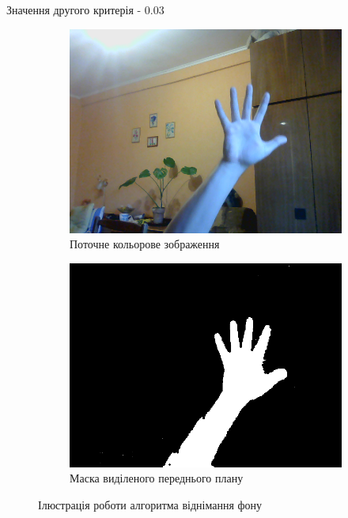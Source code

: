 Значення другого критерія - 0.03%

\begin{figure}[H]
	\centering
	\begin{subfigure}[b]{0.45\textwidth}
		\includegraphics[width=\textwidth]{practise/img/hand2}
		\caption{Поточне кольорове зображення}
	\end{subfigure}
	\hfill
	\begin{subfigure}[b]{0.45\textwidth}
		\includegraphics[width=\textwidth]{practise/img/mask2}
		\caption{Маска виділеного переднього плану}
	\end{subfigure}
	\caption{Ілюстрація роботи алгоритма віднімання фону}
	\label{fig:background_subtraction2}
\end{figure}

